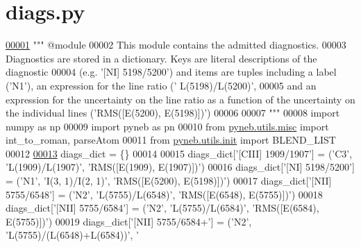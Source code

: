 \hypertarget{diags_8py_source}{}\section{diags.\+py}
\label{diags_8py_source}

\begin{DoxyCode}
\hypertarget{diags_8py_source_l00001}{}\hyperlink{namespacepyneb_1_1core_1_1diags}{00001} \textcolor{stringliteral}{""" @module}
00002 \textcolor{stringliteral}{This module contains the admitted diagnostics.}
00003 \textcolor{stringliteral}{Diagnostics are stored in a dictionary. Keys are literal descriptions of the diagnostic }
00004 \textcolor{stringliteral}{(e.g. '[NI] 5198/5200') and items are tuples including a label ('N1'), an expression for the line ratio ('
      L(5198)/L(5200)',}
00005 \textcolor{stringliteral}{and an expression for the uncertainty on the line ratio as a function of the uncertainty on the individual
       lines ('RMS([E(5200), E(5198)])')}
00006 \textcolor{stringliteral}{}
00007 \textcolor{stringliteral}{"""}
00008 \textcolor{keyword}{import} numpy \textcolor{keyword}{as} np
00009 \textcolor{keyword}{import} pyneb \textcolor{keyword}{as} pn
00010 \textcolor{keyword}{from} \hyperlink{namespacepyneb_1_1utils_1_1misc}{pyneb.utils.misc} \textcolor{keyword}{import} int\_to\_roman, parseAtom
00011 \textcolor{keyword}{from} \hyperlink{namespacepyneb_1_1utils_1_1init}{pyneb.utils.init} \textcolor{keyword}{import} BLEND\_LIST
00012 
\hypertarget{diags_8py_source_l00013}{}\hyperlink{namespacepyneb_1_1core_1_1diags_a68f98ce12c5564de62b67feff671dc98}{00013} diags\_dict = \{\}
00014 
00015 diags\_dict[\textcolor{stringliteral}{'[CIII] 1909/1907'}] = (\textcolor{stringliteral}{'C3'}, \textcolor{stringliteral}{'L(1909)/L(1907)'}, \textcolor{stringliteral}{'RMS([E(1909), E(1907)])'})
00016 diags\_dict[\textcolor{stringliteral}{'[NI] 5198/5200'}] = (\textcolor{stringliteral}{'N1'}, \textcolor{stringliteral}{'I(3, 1)/I(2, 1)'}, \textcolor{stringliteral}{'RMS([E(5200), E(5198)])'})
00017 diags\_dict[\textcolor{stringliteral}{'[NII] 5755/6548'}] = (\textcolor{stringliteral}{'N2'}, \textcolor{stringliteral}{'L(5755)/L(6548)'}, \textcolor{stringliteral}{'RMS([E(6548), E(5755)])'})
00018 diags\_dict[\textcolor{stringliteral}{'[NII] 5755/6584'}] = (\textcolor{stringliteral}{'N2'}, \textcolor{stringliteral}{'L(5755)/L(6584)'}, \textcolor{stringliteral}{'RMS([E(6584), E(5755)])'})
00019 diags\_dict[\textcolor{stringliteral}{'[NII] 5755/6584+'}] = (\textcolor{stringliteral}{'N2'}, \textcolor{stringliteral}{'L(5755)/(L(6548)+L(6584))'}, \textcolor{stringliteral}{'
}
\end{DoxyCode}
